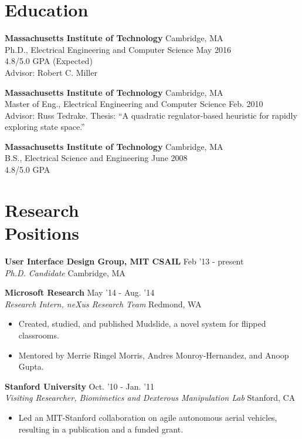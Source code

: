 \documentclass[margin]{res}
\begin{document}
\begin{resume}

\section{Education} 
{\bf Massachusetts Institute of Technology} \hfill Cambridge, MA \\
Ph.D., Electrical Engineering and Computer Science \hfill May 2016\\
4.8/5.0 GPA  \hfill (Expected) \\
Advisor: Robert C. Miller 

{\bf Massachusetts Institute of Technology} \hfill Cambridge, MA \\
Master of Eng., Electrical Engineering and Computer Science \hfill Feb. 2010 \\
Advisor: Russ Tedrake. Thesis: ``A quadratic regulator-based heuristic for rapidly exploring state space.''

{\bf Massachusetts Institute of Technology} \hfill Cambridge, MA \\
B.S., Electrical Science and Engineering \hfill June 2008 \\
4.8/5.0 GPA

\section{Research \\Positions}

{\bf User Interface Design Group, MIT CSAIL } \hfill Feb '13 - present \\ 
{\it Ph.D. Candidate} \hfill Cambridge, MA 


{\bf Microsoft Research} \hfill May '14 - Aug. '14 \\ {\it Research Intern, neXus Research Team} \hfill Redmond, WA 
 \begin{itemize} \itemsep -2pt  %
 \item Created, studied, and published Mudslide, a novel system for flipped classrooms.
\item Mentored by Merrie Ringel Morris, Andres Monroy-Hernandez, and Anoop Gupta. 
\end{itemize}

{\bf Stanford University} \hfill Oct. '10 - Jan. '11 \\ {\it Visiting Researcher, Biomimetics and Dexterous Manipulation Lab}  \hfill Stanford, CA 
 \begin{itemize} \itemsep -2pt  %
\item Led an MIT-Stanford collaboration on agile autonomous aerial vehicles, resulting in a publication and a funded grant.
 \end{itemize}


\end{resume}
\end{document}
